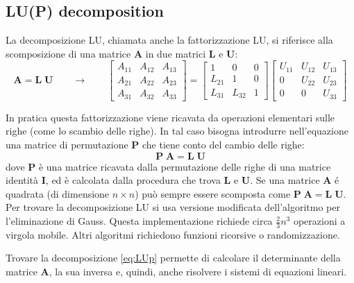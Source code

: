 \documentclass[10pt]{article}
\begin{document}
\subsection{LU(P) decomposition}


La decomposizione LU, chiamata anche la fattorizzazione LU, si riferisce alla scomposizione di una matrice $\mathbf{A}$ in due matrici $\mathbf{L}$ e $\mathbf{U}$:
\begin{equation}
\mathbf{A} = \mathbf{L} \; \mathbf{U}
\qquad \rightarrow \qquad
\begin{bmatrix}
A_{11} & A_{12} & A_{13} \\
A_{21} & A_{22} & A_{23} \\
A_{31} & A_{32} & A_{33}
\end{bmatrix} = 
\begin{bmatrix}
1 & 0 & 0 \\
L_{21} & 1 & 0 \\
L_{31} & L_{32} & 1
\end{bmatrix}
\begin{bmatrix}
U_{11} & U_{12} & U_{13} \\
0      & U_{22} & U_{23} \\
0      & 0      & U_{33}
\end{bmatrix}
\end{equation}

In pratica questa fattorizzazione viene ricavata da operazioni elementari sulle righe (come lo scambio delle righe). In tal caso bisogna introdurre nell'equazione una matrice di permutazione $\mathbf{P}$ che tiene conto del cambio delle righe:
\begin{equation}
\mathbf{P} \; \mathbf{A} = \mathbf{L} \; \mathbf{U}
\label{eq:LUp}
\end{equation}
dove $\mathbf{P}$ è una matrice ricavata dalla permutazione delle righe di una matrice identità $\mathbf{I}$, ed è calcolata dalla procedura che trova $\mathbf{L}$ e $\mathbf{U}$.
Se una matrice $\mathbf{A}$ é quadrata (di dimensione $n\times n$) può sempre essere scomposta come $\mathbf{P} \; \mathbf{A} = \mathbf{L} \; \mathbf{U}$.
Per trovare la decomposizione LU si usa versione modificata dell'algoritmo per l'eliminazione di Gauss. Questa implementazione richiede circa $\frac{2}{3}n^3$ operazioni a virgola mobile. Altri algoritmi richiedono funzioni ricorsive o randomizzazione.

Trovare la decomposizione \eqref{eq:LUp} permette di calcolare il determinante della matrice $\mathbf{A}$, la sua inversa e, quindi, anche risolvere i sistemi di equazioni lineari.
\end{document}
